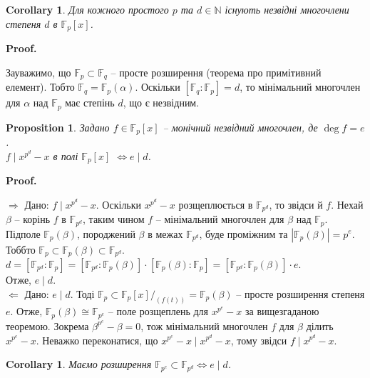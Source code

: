 \documentclass[a4paper, 10pt]{article}
\makeatletter
\def\rightproof{$\boxed{\Rightarrow}$ }
\def\leftproof{$\boxed{\Leftarrow}$ }
\theoremstyle{theoremdd}
\theoremstyle{theoremdd}
\theoremstyle{theoremdd}
\theoremstyle{theoremdd}
\theoremstyle{theoremdd}
\theoremstyle{theoremdd}
\theoremstyle{theoremdd}
\theoremstyle{theoremdd}
\theoremstyle{theoremdd}
\newtheorem{proposition}[theorem]{Proposition}
\theoremstyle{theoremdd}
\theoremstyle{theoremdd}
\theoremstyle{theoremdd}
\theoremstyle{theoremdd}
\theoremstyle{theoremdd}
\newtheorem{corollary}[theorem]{Corollary}
\theoremstyle{theoremdd}
\renewenvironment{proof}[1][Proof.\\]{\par
\pushQED{\hfill \qed}%
\normalfont \topsep6\p@\@plus6\p@\relax
\trivlist
\item\relax
{\bfseries
#1\@addpunct{.}}\hspace\labelsep\ignorespaces
}{%
\popQED\endtrivlist\@endpefalse
}
\makeatother
\begin{document}
\begin{corollary}
Для кожного простого $p$ та $d \in \mathbb{N}$ існують незвідні многочлени степеня $d$ в $\mathbb{F}_p[x]$.
\end{corollary}

\begin{proof}
Зауважимо, що $\mathbb{F}_p \subset \mathbb{F}_q$ -- просте розширення (теорема про примітивний елемент). Тобто $\mathbb{F}_q = \mathbb{F}_p(\alpha)$. Оскільки $[\mathbb{F}_q : \mathbb{F}_p] = d$, то мінімальний многочлен для $\alpha$ над $\mathbb{F}_p$ має степінь $d$, що є незвідним.
\end{proof}

\begin{proposition}
Задано $f \in \mathbb{F}_p[x]$ -- монічний незвідний многочлен, де $\deg f = e$.\\
$f \mid x^{p^d} - x$ в полі $\mathbb{F}_p[x]$ $\iff e \mid d$.
\iffalse
Монічні незвідні множники для $x^{p^d} - x$ в $\mathbb{F}_p[x]$ -- лише монічні незвідний многочлени степені $e \mid d$ в $\mathbb{F}_p[x]$.
\fi
\end{proposition}

\begin{proof}
\rightproof Дано: $f \mid x^{p^d} - x$. Оскільки $x^{p^d} - x$ розщеплюється в $\mathbb{F}_{p^d}$, то звідси й $f$. Нехай $\beta$ -- корінь $f$ в $\mathbb{F}_{p^d}$, таким чином $f$ -- мінімальний многочлен для $\beta$ над $\mathbb{F}_p$. Підполе $\mathbb{F}_p(\beta)$, породжений $\beta$ в межах $\mathbb{F}_{p^d}$, буде проміжним та $|\mathbb{F}_p(\beta)| = p^e$. Тоббто $\mathbb{F}_p \subset \mathbb{F}_p(\beta) \subset \mathbb{F}_{p^d}$.\\
$d = [\mathbb{F}_{p^d} : \mathbb{F}_p] = [\mathbb{F}_{p^d} : \mathbb{F}_p(\beta)] \cdot [\mathbb{F}_p(\beta) : \mathbb{F}_p] = [\mathbb{F}_{p^d} : \mathbb{F}_p(\beta)] \cdot e$.\\
Отже, $e \mid d$.
\bigskip \\
\leftproof Дано: $e \mid d$. Тоді $\mathbb{F}_p \subset \mathbb{F}_p[x]/_{(f(t))} = \mathbb{F}_p(\beta)$ -- просте розширення степеня $e$. Отже, $\mathbb{F}_p(\beta) \cong \mathbb{F}_{p^e}$ -- поле розщеплень для $x^{p^e} - x$ за вищезгаданою теоремою. Зокрема $\beta^{p^e} - \beta = 0$, тож мінімальний многочлен $f$ для $\beta$ ділить $x^{p^e} - x$. Неважко переконатися, що $x^{p^e} - x \mid x^{p^d} - x$, тому звідси $f \mid x^{p^d} - x$.
\end{proof}

\begin{corollary}
Маємо розширення $\mathbb{F}_{p^e} \subset \mathbb{F}_{p^d} \iff e \mid d$.
\end{corollary}
\end{document}
